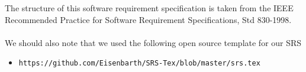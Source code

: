
The structure of this software requirement specification is taken from the IEEE
Recommended Practice for Software Requirement Specifications, Std 830-1998.
\\ \\
We should also note that we used the following open source template for our SRS
\begin{itemize}
  \item \nolinkurl{https://github.com/Eisenbarth/SRS-Tex/blob/master/srs.tex}
\end{itemize}